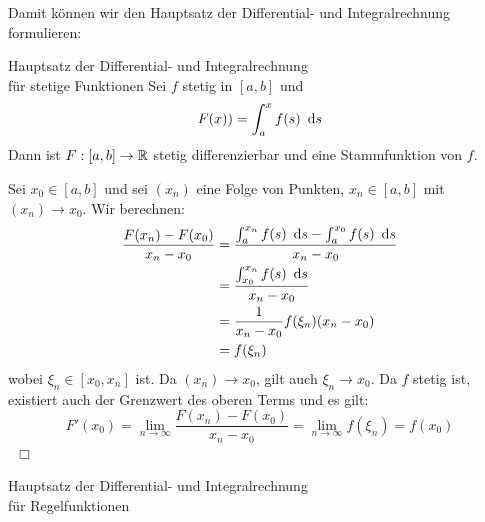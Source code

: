 \par
Damit können wir den Hauptsatz der Differential- und Integralrechnung formulieren:
\begin{satz}{Hauptsatz der Differential- und Integralrechnung\\für stetige Funktionen}
	Sei $f$ stetig in $[a,b]$ und
	\begin{equation*}
		F(x))=\int_a^x f(s)\ \operatorname{d}\! s
	\end{equation*}
	Dann ist $F:[a,b]\rightarrow \mathbb{R}$ stetig differenzierbar und eine Stammfunktion von $f$.
\end{satz}
\begin{beweis}
	Sei $x_0\in[a,b]$ und sei $(x_n)$ eine Folge von Punkten, $x_n\in[a,b]$ mit $(x_n)\to x_0$. Wir berechnen:
	\begin{align*}
		\frac{F(x_n)-F(x_0)}{x_n-x_0}&=\frac{\int_a^{x_n} f(s)\ \operatorname{d}\! s-\int_a^{x_0} f(s)\ \operatorname{d}\! s}{x_n-x_0}\\
		&=\frac{\int_{x_0}^{x_n} f(s)\ \operatorname{d}\! s}{x_n-x_0}\\
		&=\frac{1}{x_n-x_0}f(\xi_n)(x_n-x_0)\\
		&=f(\xi_n)
	\end{align*}
	wobei $\xi_n\in[x_0,x_n]$ ist.
	Da $(x_n)\to x_0$, gilt auch $\xi_n\to x_0$. Da $f$ stetig ist, existiert auch der Grenzwert des oberen Terms und es gilt:
	\begin{equation*}
		F'(x_0)=\lim\limits_{n\to\infty}\frac{F(x_n)-F(x_0)}{x_n-x_0}=\lim\limits_{n\to\infty}f(\xi_n)=f(x_0)
	\end{equation*}
	\ \hfill$\Box$
\end{beweis}

\begin{satz}{Hauptsatz der Differential- und Integralrechnung\\für Regelfunktionen}

\end{satz}
